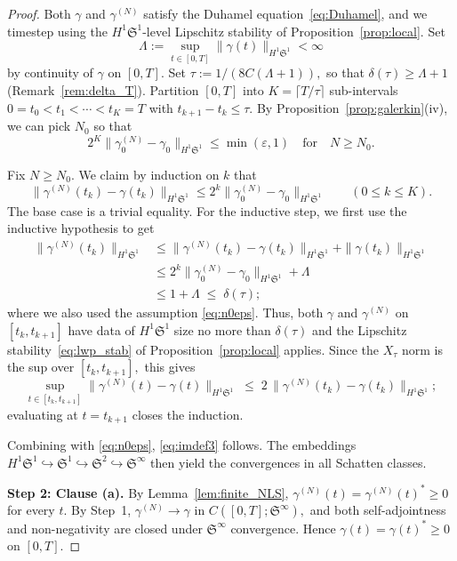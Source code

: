\documentclass[11pt]{amsart}
\theoremstyle{definition}
\newcommand{\Sp}{\mathfrak{S}}
\begin{document}
\begin{proof}
Both $\gamma$ and $\gamma^{(N)}$ satisfy the Duhamel equation~\eqref{eq:Duhamel}, and we timestep using the $H^1\Sp^1$-level Lipschitz stability of Proposition~\ref{prop:local}. Set 
\[
\Lambda:=\sup_{t\in[0,T]}\|\gamma(t)\|_{H^1\Sp^1}<\infty
\]
 by continuity of $\gamma$ on $[0,T].$ Set $\tau:=1/(8C(\Lambda+1)),$ so that $\delta(\tau)\ge\Lambda+1$ (Remark~\ref{rem:delta_T}). Partition $[0,T]$ into $K=\lceil T/\tau\rceil$ sub-intervals $0=t_0<t_1<\cdots<t_K=T$ with $t_{k+1}-t_k\le\tau.$ By Proposition~\ref{prop:galerkin}(iv), we can pick $N_0$ so that 
 \begin{equation}\label{eq:n0eps}
 2^K\|\gamma_0^{(N)}-\gamma_0\|_{H^1\Sp^1}\le \min(\varepsilon,1) \quad\mbox{for} \quad N\ge N_0.
  \end{equation}

Fix $N\ge N_0.$ We claim by induction on $k$ that
\begin{equation}\label{eq:lfs_ind}
  \|\gamma^{(N)}(t_k)-\gamma(t_k)\|_{H^1\Sp^1}\le 2^k\|\gamma_0^{(N)}-\gamma_0\|_{H^1\Sp^1}
  \qquad(0\le k\le K).
\end{equation}
The base case is a trivial equality. For the inductive step, we first use the inductive hypothesis to get
\[
\begin{aligned}
  \|\gamma^{(N)}(t_k)\|_{H^1\Sp^1}
  &\le \|\gamma^{(N)}(t_k)-\gamma(t_k)\|_{H^1\Sp^1} + \|\gamma(t_k)\|_{H^1\Sp^1}\\
  &\le 2^k\|\gamma_0^{(N)}-\gamma_0\|_{H^1\Sp^1} + \Lambda\\
  &\le 1+ \Lambda\;\le\;\delta(\tau);
\end{aligned}
\]
where we also used the assumption \eqref{eq:n0eps}.
Thus,  both $\gamma$ and $\gamma^{(N)}$ on $[t_k,t_{k+1}]$ have data of $H^1\Sp^1$ size no more than $\delta(\tau)$ and the Lipschitz stability~\eqref{eq:lwp_stab} of Proposition~\ref{prop:local} applies. Since the $X_\tau$ norm is the sup over $[t_k,t_{k+1}],$ this gives
\[
  \sup_{t\in[t_k,t_{k+1}]}\|\gamma^{(N)}(t)-\gamma(t)\|_{H^1\Sp^1}\;\le\; 2\,\|\gamma^{(N)}(t_k)-\gamma(t_k)\|_{H^1\Sp^1};
\]
evaluating at $t=t_{k+1}$ closes the induction. 

Combining with \eqref{eq:n0eps}, \eqref{eq:imdef3} follows. The embeddings $H^1\Sp^1\hookrightarrow\Sp^1\hookrightarrow\Sp^2\hookrightarrow\Sp^\infty$ then yield the convergences in all Schatten classes. %

\smallskip
\noindent\textbf{Step 2: Clause (a).} By Lemma~\ref{lem:finite_NLS}, $\gamma^{(N)}(t)=\gamma^{(N)}(t)^*\ge 0$ for every $t.$ By Step~1, $\gamma^{(N)}\to\gamma$ in $C([0,T];\Sp^\infty),$ and both self-adjointness and non-negativity are closed under $\Sp^\infty$ convergence. Hence $\gamma(t)=\gamma(t)^*\ge 0$ on $[0,T].$


\end{proof}
\end{document}

